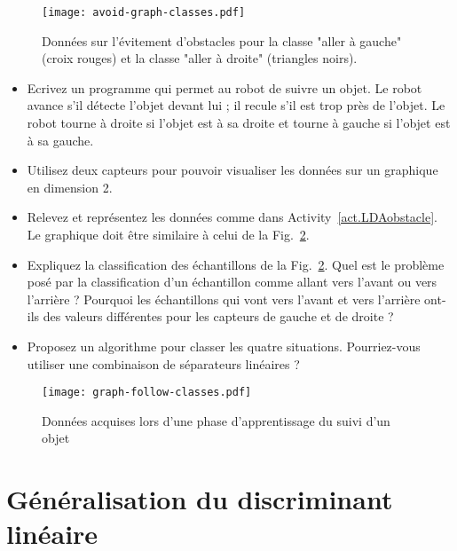 \begin{figure}
\begin{center}
\texttt{[image: avoid-graph-classes.pdf]}
\end{center}
\caption{Données sur l'évitement d'obstacles pour la classe "aller à gauche" (croix rouges) et la classe "aller à droite" (triangles noirs).}\label{fig.machlearnavoid}
\end{figure}

\begin{framed}
\begin{itemize}
\item Ecrivez un programme qui permet au robot de suivre un objet. Le robot avance s'il détecte l'objet devant lui ; il recule s'il est trop près de l'objet. Le robot tourne à droite si l'objet est à sa droite et tourne à gauche si l'objet est à sa gauche.
\item Utilisez deux capteurs pour pouvoir visualiser les données sur un graphique en dimension 2.
\item Relevez et représentez les données comme dans Activity~\ref{act.LDAobstacle}. Le graphique doit être similaire à celui de la Fig.~\ref{fig.machlearnfollow}.
\item Expliquez la classification des échantillons de la Fig.~\ref{fig.machlearnfollow}. Quel est le problème posé par la classification d'un échantillon comme allant vers l'avant ou vers l'arrière ? Pourquoi les échantillons qui vont vers l'avant et vers l'arrière ont-ils des valeurs différentes pour les capteurs de gauche et de droite ?
\item Proposez un algorithme pour classer les quatre situations. Pourriez-vous utiliser une combinaison de séparateurs linéaires ?
\end{itemize}
\end{framed}

\begin{figure}
\begin{center}
\texttt{[image: graph-follow-classes.pdf]}
\end{center}
\caption{Données acquises lors d'une phase d'apprentissage du suivi d'un objet}\label{fig.machlearnfollow}
\end{figure}

\section{Généralisation du discriminant linéaire}\label{s.gen-lda}

